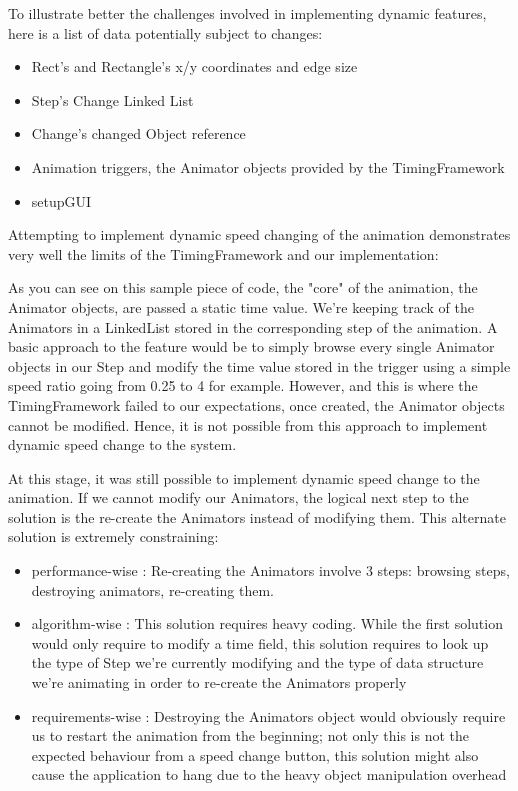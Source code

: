 \documentclass{l3proj}
\begin{document}
To illustrate better the challenges involved in implementing dynamic features, here is a list of data potentially subject to changes:
\begin{itemize}
\item Rect's and Rectangle's x/y coordinates and edge size
\item Step's Change Linked List 
\item Change's changed Object reference
\item Animation triggers, the Animator objects provided by the TimingFramework
\item setupGUI
\end{itemize}

Attempting to implement dynamic speed changing of the animation demonstrates very well the limits of the TimingFramework and our implementation:


As you can see on this sample piece of code, the "core" of the animation, the Animator objects, are passed a static time value. We're keeping track of the Animators in a LinkedList stored in the corresponding step of the animation. A basic approach to the feature would be to simply browse every single Animator objects in our Step and modify the time value stored in the trigger using a simple speed ratio going from 0.25 to 4 for example. However, and this is where the TimingFramework failed to our expectations, once created, the Animator objects cannot be modified. Hence, it is not possible from this approach to implement dynamic speed change to the system.

At this stage, it was still possible to implement dynamic speed change to the animation. If we cannot modify our Animators, the logical next step to the solution is the re-create the Animators instead of modifying them. This alternate solution is extremely constraining:
\begin{itemize}
\item performance-wise : Re-creating the Animators involve 3 steps: browsing steps, destroying animators, re-creating them.
\item algorithm-wise : This solution requires heavy coding. While the first solution would only require to modify a time field, this solution requires to look up the type of Step we're currently modifying and the type of data structure we're animating in order to re-create the Animators properly
\item requirements-wise : Destroying the Animators object would obviously require us to restart the animation from the beginning; not only this is not the expected behaviour from a speed change button, this solution might also cause the application to hang due to the heavy object manipulation overhead
\end{itemize}
\end{document}
